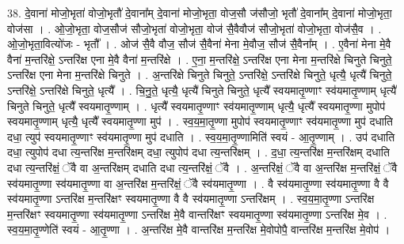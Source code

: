 \documentclass[17pt]{extarticle}
\begin{document}
38. दे॒वाना॑ मोजो॒भृता॑ वोजो॒भृतौ॑ दे॒वाना᳚म् दे॒वाना॑ मोजो॒भृता॒ वोज॒सौ ज॑सौजो॒ भृतौ॑ दे॒वाना᳚म् दे॒वाना॑ मोजो॒भृता॒ वोज॑सा । . ओ॒जो॒भृता॒ वोज॒सौज॑ सौजो॒भृता॑ वोजो॒भृता॒ वोज॑ सै॒वैवौज॑ सौजो॒भृता॑ वोजो॒भृता॒ वोज॑सै॒व । . ओ॒जो॒भृता॒वित्यो॑जः - भृतौ᳚ । . ओज॑ सै॒वै वौज॒ सौज॑ सै॒वैना॑ मेना मे॒वौज॒ सौज॑ सै॒वैना᳚म् । . ए॒वैना॑ मेना मे॒वै वैना॑ म॒न्तरि॑क्षे॒ ऽन्तरि॑क्ष एना मे॒वै वैना॑ म॒न्तरि॑क्षे । . ए॒ना॒ म॒न्तरि॑क्षे॒ ऽन्तरि॑क्ष एना मेना म॒न्तरि॑क्षे चिनुते चिनुते॒ ऽन्तरि॑क्ष एना मेना म॒न्तरि॑क्षे चिनुते । . अ॒न्तरि॑क्षे चिनुते चिनुते॒ ऽन्तरि॑क्षे॒ ऽन्तरि॑क्षे चिनुते॒ धृत्यै॒ धृत्यै॑ चिनुते॒ ऽन्तरि॑क्षे॒ ऽन्तरि॑क्षे चिनुते॒ धृत्यै᳚ । . चि॒नु॒ते॒ धृत्यै॒ धृत्यै॑ चिनुते चिनुते॒ धृत्यै᳚ स्वयमातृ॒ण्णाꣳ स्व॑यमातृ॒ण्णाम् धृत्यै॑ चिनुते चिनुते॒ धृत्यै᳚ स्वयमातृ॒ण्णाम् । . धृत्यै᳚ स्वयमातृ॒ण्णाꣳ स्व॑यमातृ॒ण्णाम् धृत्यै॒ धृत्यै᳚ स्वयमातृ॒ण्णा मुपोप॑ स्वयमातृ॒ण्णाम् धृत्यै॒ धृत्यै᳚ स्वयमातृ॒ण्णा मुप॑ । . स्व॒य॒मा॒तृ॒ण्णा मुपोप॑ स्वयमातृ॒ण्णाꣳ स्व॑यमातृ॒ण्णा मुप॑ दधाति दधा॒ त्युप॑ स्वयमातृ॒ण्णाꣳ स्व॑यमातृ॒ण्णा मुप॑ दधाति । . स्व॒य॒मा॒तृ॒ण्णामिति॑ स्वयं - आ॒तृ॒ण्णाम् । . उप॑ दधाति दधा॒ त्युपोप॑ दधा त्य॒न्तरि॑क्ष म॒न्तरि॑क्षम् दधा॒ त्युपोप॑ दधा त्य॒न्तरि॑क्षम् । . द॒धा॒ त्य॒न्तरि॑क्ष म॒न्तरि॑क्षम् दधाति दधा त्य॒न्तरि॑क्षं॒ ॅवै वा अ॒न्तरि॑क्षम् दधाति दधा
त्य॒न्तरि॑क्षं॒ ॅवै । . अ॒न्तरि॑क्षं॒ ॅवै वा अ॒न्तरि॑क्ष म॒न्तरि॑क्षं॒ ॅवै स्व॑यमातृ॒ण्णा स्व॑यमातृ॒ण्णा वा अ॒न्तरि॑क्ष म॒न्तरि॑क्षं॒ ॅवै स्व॑यमातृ॒ण्णा । . वै स्व॑यमातृ॒ण्णा स्व॑यमातृ॒ण्णा वै वै स्व॑यमातृ॒ण्णा ऽन्तरि॑क्ष म॒न्तरि॑क्षꣳ स्वयमातृ॒ण्णा वै वै स्व॑यमातृ॒ण्णा ऽन्तरि॑क्षम् । . स्व॒य॒मा॒तृ॒ण्णा ऽन्तरि॑क्ष म॒न्तरि॑क्षꣳ स्वयमातृ॒ण्णा स्व॑यमातृ॒ण्णा ऽन्तरि॑क्ष 
मे॒वै वान्तरि॑क्षꣳ स्वयमातृ॒ण्णा स्व॑यमातृ॒ण्णा ऽन्तरि॑क्ष मे॒व । . स्व॒य॒मा॒तृ॒ण्णेति॑ स्वयं - आ॒तृ॒ण्णा । . अ॒न्तरि॑क्ष मे॒वै वान्तरि॑क्ष म॒न्तरि॑क्ष मे॒वोपोपै॒ वान्तरि॑क्ष म॒न्तरि॑क्ष मे॒वोप॑ । \newline
\end{document}
